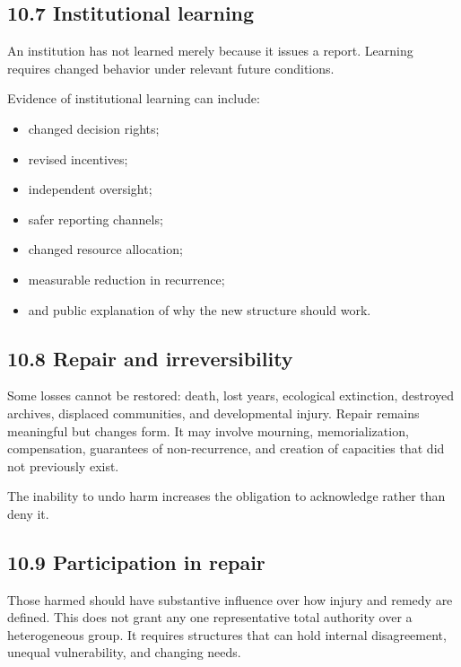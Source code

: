 \documentclass[
  11pt,
]{article}
\providecommand{\tightlist}{%
  \setlength{\itemsep}{0pt}\setlength{\parskip}{0pt}}
\begin{document}
\subsection{10.7 Institutional learning}\label{institutional-learning}

An institution has not learned merely because it issues a report.
Learning requires changed behavior under relevant future conditions.

Evidence of institutional learning can include:

\begin{itemize}
\tightlist
\item
  changed decision rights;
\item
  revised incentives;
\item
  independent oversight;
\item
  safer reporting channels;
\item
  changed resource allocation;
\item
  measurable reduction in recurrence;
\item
  and public explanation of why the new structure should work.
\end{itemize}

\subsection{10.8 Repair and
irreversibility}\label{repair-and-irreversibility}

Some losses cannot be restored: death, lost years, ecological
extinction, destroyed archives, displaced communities, and developmental
injury. Repair remains meaningful but changes form. It may involve
mourning, memorialization, compensation, guarantees of non-recurrence,
and creation of capacities that did not previously exist.

The inability to undo harm increases the obligation to acknowledge
rather than deny it.

\subsection{10.9 Participation in repair}\label{participation-in-repair}

Those harmed should have substantive influence over how injury and
remedy are defined. This does not grant any one representative total
authority over a heterogeneous group. It requires structures that can
hold internal disagreement, unequal vulnerability, and changing needs.
\end{document}
